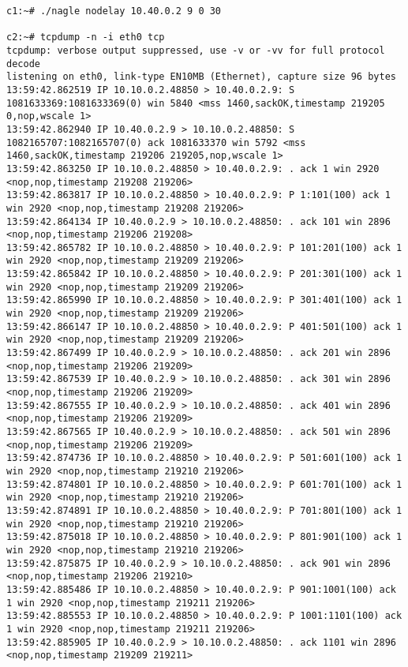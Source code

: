 \documentclass[a4paper,12pt]{article}
\begin{document}
\begin{lstlisting}
c1:~# ./nagle nodelay 10.40.0.2 9 0 30

c2:~# tcpdump -n -i eth0 tcp
tcpdump: verbose output suppressed, use -v or -vv for full protocol decode
listening on eth0, link-type EN10MB (Ethernet), capture size 96 bytes
13:59:42.862519 IP 10.10.0.2.48850 > 10.40.0.2.9: S 1081633369:1081633369(0) win 5840 <mss 1460,sackOK,timestamp 219205 0,nop,wscale 1>
13:59:42.862940 IP 10.40.0.2.9 > 10.10.0.2.48850: S 1082165707:1082165707(0) ack 1081633370 win 5792 <mss 1460,sackOK,timestamp 219206 219205,nop,wscale 1>
13:59:42.863250 IP 10.10.0.2.48850 > 10.40.0.2.9: . ack 1 win 2920 <nop,nop,timestamp 219208 219206>
13:59:42.863817 IP 10.10.0.2.48850 > 10.40.0.2.9: P 1:101(100) ack 1 win 2920 <nop,nop,timestamp 219208 219206>
13:59:42.864134 IP 10.40.0.2.9 > 10.10.0.2.48850: . ack 101 win 2896 <nop,nop,timestamp 219206 219208>
13:59:42.865782 IP 10.10.0.2.48850 > 10.40.0.2.9: P 101:201(100) ack 1 win 2920 <nop,nop,timestamp 219209 219206>
13:59:42.865842 IP 10.10.0.2.48850 > 10.40.0.2.9: P 201:301(100) ack 1 win 2920 <nop,nop,timestamp 219209 219206>
13:59:42.865990 IP 10.10.0.2.48850 > 10.40.0.2.9: P 301:401(100) ack 1 win 2920 <nop,nop,timestamp 219209 219206>
13:59:42.866147 IP 10.10.0.2.48850 > 10.40.0.2.9: P 401:501(100) ack 1 win 2920 <nop,nop,timestamp 219209 219206>
13:59:42.867499 IP 10.40.0.2.9 > 10.10.0.2.48850: . ack 201 win 2896 <nop,nop,timestamp 219206 219209>
13:59:42.867539 IP 10.40.0.2.9 > 10.10.0.2.48850: . ack 301 win 2896 <nop,nop,timestamp 219206 219209>
13:59:42.867555 IP 10.40.0.2.9 > 10.10.0.2.48850: . ack 401 win 2896 <nop,nop,timestamp 219206 219209>
13:59:42.867565 IP 10.40.0.2.9 > 10.10.0.2.48850: . ack 501 win 2896 <nop,nop,timestamp 219206 219209>
13:59:42.874736 IP 10.10.0.2.48850 > 10.40.0.2.9: P 501:601(100) ack 1 win 2920 <nop,nop,timestamp 219210 219206>
13:59:42.874801 IP 10.10.0.2.48850 > 10.40.0.2.9: P 601:701(100) ack 1 win 2920 <nop,nop,timestamp 219210 219206>
13:59:42.874891 IP 10.10.0.2.48850 > 10.40.0.2.9: P 701:801(100) ack 1 win 2920 <nop,nop,timestamp 219210 219206>
13:59:42.875018 IP 10.10.0.2.48850 > 10.40.0.2.9: P 801:901(100) ack 1 win 2920 <nop,nop,timestamp 219210 219206>
13:59:42.875875 IP 10.40.0.2.9 > 10.10.0.2.48850: . ack 901 win 2896 <nop,nop,timestamp 219206 219210>
13:59:42.885486 IP 10.10.0.2.48850 > 10.40.0.2.9: P 901:1001(100) ack 1 win 2920 <nop,nop,timestamp 219211 219206>
13:59:42.885553 IP 10.10.0.2.48850 > 10.40.0.2.9: P 1001:1101(100) ack 1 win 2920 <nop,nop,timestamp 219211 219206>
13:59:42.885905 IP 10.40.0.2.9 > 10.10.0.2.48850: . ack 1101 win 2896 <nop,nop,timestamp 219209 219211>

\end{lstlisting}
\end{document}
